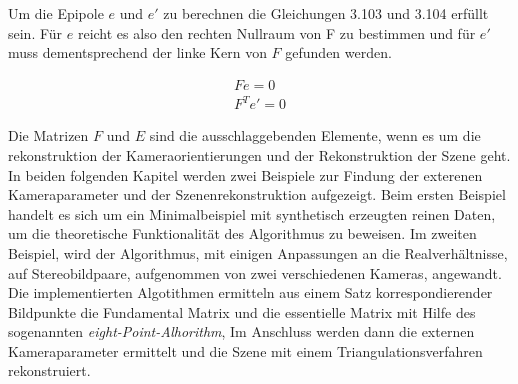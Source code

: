  Um die Epipole $e$ und $e'$ zu berechnen die Gleichungen 3.103 und 3.104 erfüllt sein. Für $e$ reicht es also den rechten Nullraum von F zu bestimmen und für $e'$ muss dementsprechend der linke Kern von $F$ gefunden werden. 
 
 \begin{gather}
 	Fe = 0\\
 	F^Te' = 0
 \end{gather}
 
 Die Matrizen $F$ und $E$ sind die ausschlaggebenden Elemente, wenn es um die rekonstruktion der Kameraorientierungen und der Rekonstruktion der Szene geht. In beiden folgenden Kapitel werden zwei Beispiele zur Findung der exterenen Kameraparameter und der Szenenrekonstruktion aufgezeigt. Beim ersten Beispiel handelt es sich um ein Minimalbeispiel mit synthetisch erzeugten reinen Daten, um die theoretische Funktionalität des Algorithmus zu beweisen. Im zweiten Beispiel, wird der Algorithmus, mit einigen Anpassungen an die Realverhältnisse, auf Stereobildpaare, aufgenommen von zwei verschiedenen Kameras, angewandt. Die implementierten Algotithmen ermitteln aus einem Satz korrespondierender Bildpunkte die Fundamental Matrix und die essentielle Matrix mit Hilfe des sogenannten \textit{eight-Point-Alhorithm}, Im Anschluss werden dann die externen Kameraparameter ermittelt und die Szene mit einem Triangulationsverfahren rekonstruiert. 
 
